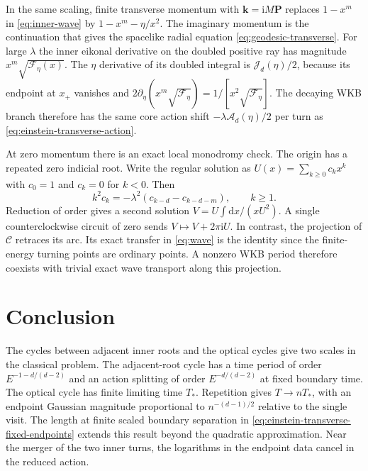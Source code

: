 \documentclass[11pt,a4paper]{article}
\newcommand{\dd}{\mathrm{d}}
\newcommand{\ii}{\mathrm{i}}
\begin{document}
In the same scaling, finite transverse momentum with
\(\boldsymbol k=\ii M\boldsymbol P\) replaces \(1-x^m\) in
\eqref{eq:inner-wave} by \(1-x^m-\eta/x^2\).
The imaginary momentum is the continuation that gives the
spacelike radial equation \eqref{eq:geodesic-transverse}.
For large \(\lambda\) the inner eikonal derivative on the
doubled positive ray has magnitude \(x^m\sqrt{\mathcal F_\eta(x)}\).
The \(\eta\) derivative of its doubled integral is
\(\mathcal J_d(\eta)/2\), because its endpoint at \(x_+\)
vanishes and \(2\partial_\eta(x^m\sqrt{\mathcal F_\eta})=
1/[x^2\sqrt{\mathcal F_\eta}]\).
The decaying WKB branch therefore has the same core action
shift \(-\lambda\mathcal A_d(\eta)/2\) per turn as
\eqref{eq:einstein-transverse-action}.

At zero momentum there is an exact local monodromy check. The origin has a repeated zero indicial root. Write the regular solution as \(U(x)=\sum_{k\geq0} c_k x^k\) with \(c_0=1\) and \(c_k=0\) for \(k<0\). Then
\begin{equation}
 k^2 c_k=-\lambda^2(c_{k-d}-c_{k-d-m}),\qquad k\geq1.
\end{equation}
Reduction of order gives a second solution \(V=U\int \dd x/(x U^2)\). A single counterclockwise circuit of zero sends \(V\mapsto V+2\pi\ii U\). In contrast, the projection of \(\mathcal C\) retraces its arc. Its exact transfer in \eqref{eq:wave} is the identity since the finite-energy turning points are ordinary points. A nonzero WKB period therefore coexists with trivial exact wave transport along this projection.





\section{Conclusion}

The cycles between adjacent inner roots and the optical cycles give two scales in the classical problem. The adjacent-root cycle has a time period of order \(E^{-1-d/(d-2)}\) and an action splitting of order \(E^{-d/(d-2)}\) at fixed boundary time. The optical cycle has finite limiting time \(T_*\). Repetition gives \(T\to nT_*\), with an endpoint Gaussian magnitude proportional to \(n^{-(d-1)/2}\) relative to the single visit. The length at finite scaled boundary separation in \eqref{eq:einstein-transverse-fixed-endpoints} extends this result beyond the quadratic approximation. Near the merger of the two inner turns, the logarithms in the endpoint data cancel in the reduced action.
\end{document}
